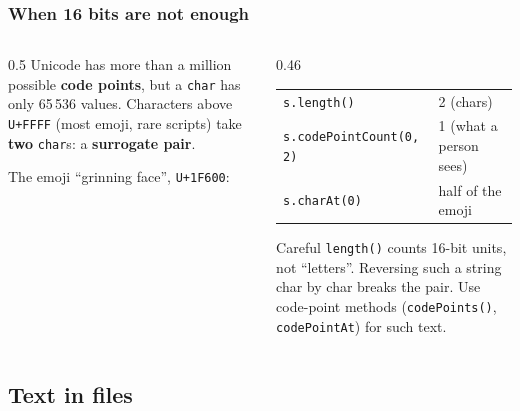 \documentclass[aspectratio=169,10pt,compress]{beamer}
\begin{document}
\begin{frame}[t,fragile] \frametitle{When 16 bits are not enough}
  \begin{columns}[T]
    \begin{column}{0.5\textwidth}
      \small Unicode has more than a million possible \textbf{code points}, but a \texttt{char} has only 65\,536 values.
      Characters above \texttt{U+FFFF} (most emoji, rare scripts) take \textbf{two} \texttt{char}s:
      a \textbf{surrogate pair}.

      \vspace{0.5em}
      The emoji ``grinning face'', \texttt{U+1F600}:
      \begin{center}
      \end{center}
    \end{column}
    \begin{column}{0.46\textwidth}
      \footnotesize
      \begin{tabular}{@{}ll@{}}
        \toprule
        \texttt{s.length()}            & 2 (chars) \\
        \texttt{s.codePointCount(0, 2)} & 1 (what a person sees) \\
        \texttt{s.charAt(0)}           & half of the emoji \\
        \bottomrule
      \end{tabular}

      \vspace{0.6em}
      \begin{alertblock}{Careful}
        \small \texttt{length()} counts 16-bit units, not ``letters''. Reversing such a string
        char by char breaks the pair. Use code-point methods (\texttt{codePoints()}, \texttt{codePointAt}) for such text.
      \end{alertblock}
    \end{column}
  \end{columns}
\end{frame}

\subsection[Bytes]{Text in files}
\end{document}
